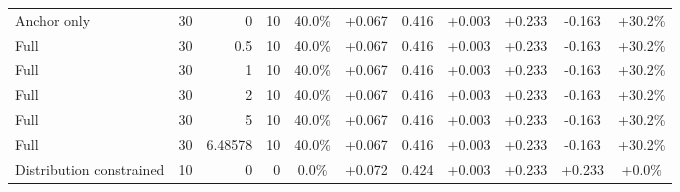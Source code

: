 \begin{table}[htbp]
\begin{tabular}{lrrrccccccc}
Anchor only & 30 & 0 & 10 & 40.0\% & +0.067 & 0.416 & +0.003 & +0.233 & -0.163 & +30.2\% \\
Full & 30 & 0.5 & 10 & 40.0\% & +0.067 & 0.416 & +0.003 & +0.233 & -0.163 & +30.2\% \\
Full & 30 & 1 & 10 & 40.0\% & +0.067 & 0.416 & +0.003 & +0.233 & -0.163 & +30.2\% \\
Full & 30 & 2 & 10 & 40.0\% & +0.067 & 0.416 & +0.003 & +0.233 & -0.163 & +30.2\% \\
Full & 30 & 5 & 10 & 40.0\% & +0.067 & 0.416 & +0.003 & +0.233 & -0.163 & +30.2\% \\
Full & 30 & 6.48578 & 10 & 40.0\% & +0.067 & 0.416 & +0.003 & +0.233 & -0.163 & +30.2\% \\
Distribution constrained & 10 & 0 & 0 & 0.0\% & +0.072 & 0.424 & +0.003 & +0.233 & +0.233 & +0.0\% \\
\bottomrule
\end{tabular}
\end{table}